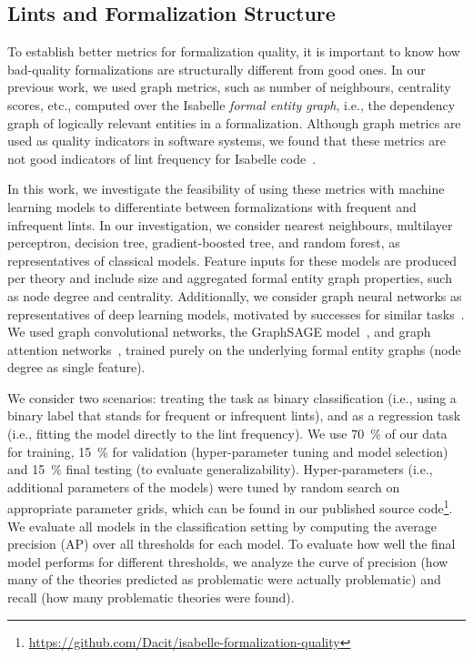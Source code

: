 \subsection{Lints and Formalization Structure}
To establish better metrics for formalization quality,
it is important to know how bad-quality formalizations are structurally different from good ones.
In our previous work,
we used graph metrics, such as number of neighbours, centrality scores, etc., computed over the Isabelle \emph{formal entity graph},
i.e., the dependency graph of logically relevant entities in a formalization.
Although graph metrics are used as quality indicators in software systems,
we found that these metrics are not good indicators of lint frequency for Isabelle code~\cite{Formal2022Huch}.

In this work, we investigate the feasibility of using these metrics with machine learning models
to differentiate between formalizations with frequent and infrequent lints.
In our investigation, we consider nearest neighbours, multilayer perceptron, decision tree, gradient-boosted tree, and random forest,
as representatives of classical models.
Feature inputs for these models are produced per theory and include size and aggregated formal entity graph properties, such as node degree and centrality.
Additionally,
we consider graph neural networks as representatives of deep learning models, motivated by successes for similar tasks~\cite{GNNDefect2022Sikic}.
We used graph convolutional networks, the GraphSAGE model~\cite{hamilton2018inductive}, and graph attention networks~\cite{veličković2018graph},
trained purely on the underlying formal entity graphs
(node degree as single feature).

We consider two scenarios: treating the task as binary classification
(i.e., using a binary label that stands for frequent or infrequent lints),
and as a regression task
(i.e., fitting the model directly to the lint frequency).
We use \SI{70}{\percent} of our data for training, \SI{15}{\percent} for validation
(hyper-parameter tuning and model selection)
and \SI{15}{\percent} final testing (to evaluate generalizability).
Hyper-parameters (i.e., additional parameters of the models) were tuned by random search on appropriate parameter grids,
which can be found in our published source code\footnote{\url{https://github.com/Dacit/isabelle-formalization-quality}}.
We evaluate all models in the classification setting by computing the average precision (AP) over all thresholds for each model.
To evaluate how well the final model performs for different thresholds,
we analyze the curve of precision (how many of the theories predicted as problematic were actually problematic) and recall (how many problematic theories were found).

